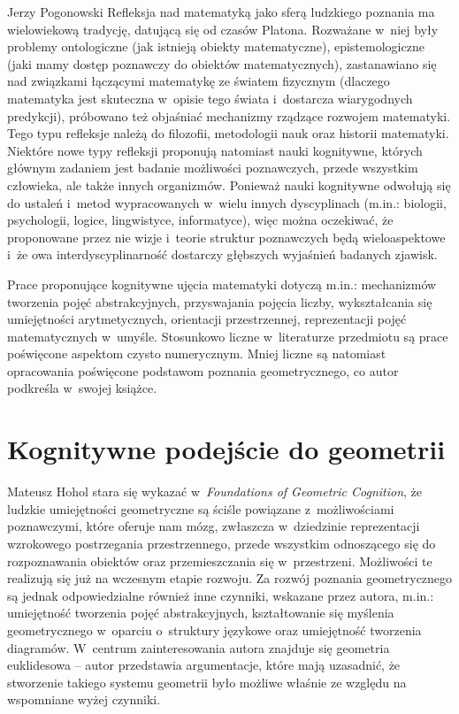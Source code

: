 \begin{newrevplenv}{Jerzy Pogonowski}
Refleksja nad matematyką jako sferą ludzkiego poznania ma
wielowiekową tradycję, datującą się od czasów Platona. Rozważane w~niej były problemy ontologiczne (jak istnieją obiekty
matematyczne), epistemologiczne (jaki mamy dostęp poznawczy do
obiektów matematycznych), zastanawiano się nad związkami łączącymi
matematykę ze światem fizycznym (dlaczego matematyka jest
skuteczna w~opisie tego świata i~dostarcza wiarygodnych
predykcji), próbowano też objaśniać mechanizmy rządzące rozwojem
matematyki. Tego typu refleksje należą do filozofii, metodologii
nauk oraz historii matematyki. Niektóre nowe typy refleksji
proponują natomiast nauki kognitywne, których głównym zadaniem
jest badanie możliwości poznawczych, przede wszystkim człowieka,
ale także innych organizmów. Ponieważ nauki kognitywne odwołują
się do ustaleń i~metod wypracowanych w~wielu innych dyscyplinach
(m.in.: biologii, psychologii, logice, lingwistyce, informatyce),
więc można oczekiwać, że proponowane przez nie wizje i~teorie
struktur poznawczych będą wieloaspektowe i~że owa
interdyscyplinarność dostarczy głębszych wyjaśnień badanych
zjawisk.

Prace proponujące kognitywne ujęcia matematyki dotyczą m.in.:
mechanizmów tworzenia pojęć abstrakcyjnych, przyswajania pojęcia
liczby, wykształcania się umiejętności arytmetycznych, orientacji
przestrzennej, reprezentacji pojęć matematycznych w~umyśle. Stosunkowo
liczne w~literaturze przedmiotu są prace poświęcone aspektom
czysto numerycznym. Mniej liczne są natomiast opracowania
poświęcone podstawom poznania geometrycznego, co autor podkreśla w~swojej książce.

\section{Kognitywne podejście do geometrii}

Mateusz Hohol stara się wykazać w~{\em Foundations of Geometric
Cognition}, że ludzkie umiejętności geometryczne są ściśle
powiązane z~możliwościami poznawczymi, które oferuje nam mózg,
zwłaszcza w~dziedzinie reprezentacji wzrokowego postrzegania
przestrzennego, przede wszystkim odnoszącego się do rozpoznawania
obiektów oraz przemieszczania się w~przestrzeni. Możliwości te
realizują się już na wczesnym etapie rozwoju. Za rozwój poznania
geometrycznego są jednak odpowiedzialne również inne czynniki,
wskazane przez autora, m.in.: umiejętność tworzenia pojęć
abstrakcyjnych, kształtowanie się myślenia geometrycznego w~oparciu o~struktury językowe oraz umiejętność tworzenia diagramów.
W~centrum zainteresowania autora znajduje się geometria
euklidesowa -- autor przedstawia argumentacje, które mają
uzasadnić, że stworzenie takiego systemu geometrii było możliwe
właśnie ze względu na wspomniane wyżej czynniki.


\end{newrevplenv}
